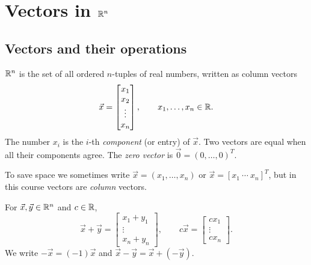 \chapter{Vectors in $\R^n$}

\section{Vectors and their operations}

\begin{definition}[$\R^n$]
$\R^n$ is the set of all ordered $n$-tuples of real numbers, written as column vectors
\[
  \vec{x} = \begin{bmatrix} x_1 \\ x_2 \\ \vdots \\ x_n \end{bmatrix}, \qquad x_1,\dots,x_n \in \mathbb{R} .
\]
The number $x_i$ is the $i$-th \emph{component} (or entry) of $\vec x$. Two vectors are equal
when all their components agree. The \emph{zero vector} is $\vec 0 = (0,\dots,0)^T$.
\end{definition}

To save space we sometimes write $\vec x = (x_1,\dots,x_n)$ or $\vec x = [x_1 \ \cdots \ x_n]^T$,
but in this course vectors are \emph{column} vectors.

\begin{definition}
For $\vec x,\vec y\in\mathbb{R}^n$ and $c\in\mathbb{R}$,
\[
  \vec x + \vec y = \begin{bmatrix} x_1+y_1 \\ \vdots \\ x_n+y_n\end{bmatrix}, \qquad
  c\vec x = \begin{bmatrix} cx_1 \\ \vdots \\ cx_n \end{bmatrix}.
\]
We write $-\vec x = (-1)\vec x$ and $\vec x - \vec y = \vec x + (-\vec y)$.
\end{definition}

